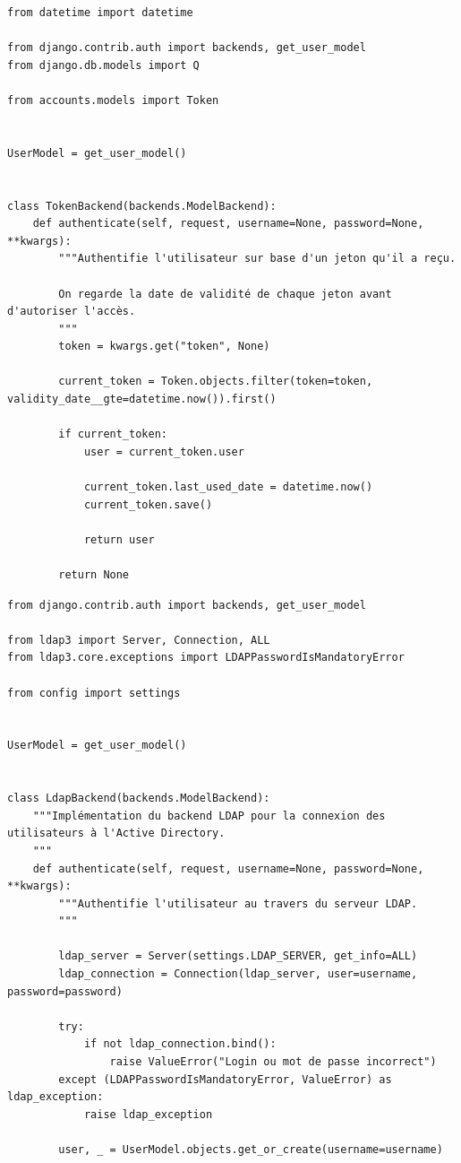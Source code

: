 \documentclass[11pt]{amsbook}
\begin{document}
\begin{verbatim}
from datetime import datetime

from django.contrib.auth import backends, get_user_model
from django.db.models import Q

from accounts.models import Token  


UserModel = get_user_model()


class TokenBackend(backends.ModelBackend):
    def authenticate(self, request, username=None, password=None, **kwargs):
        """Authentifie l'utilisateur sur base d'un jeton qu'il a reçu.

        On regarde la date de validité de chaque jeton avant d'autoriser l'accès.
        """
        token = kwargs.get("token", None)

        current_token = Token.objects.filter(token=token, validity_date__gte=datetime.now()).first()

        if current_token:
            user = current_token.user

            current_token.last_used_date = datetime.now()
            current_token.save()

            return user

        return None
\end{verbatim}


\begin{verbatim}
from django.contrib.auth import backends, get_user_model

from ldap3 import Server, Connection, ALL
from ldap3.core.exceptions import LDAPPasswordIsMandatoryError

from config import settings


UserModel = get_user_model()


class LdapBackend(backends.ModelBackend):
    """Implémentation du backend LDAP pour la connexion des utilisateurs à l'Active Directory.
    """
    def authenticate(self, request, username=None, password=None, **kwargs):
        """Authentifie l'utilisateur au travers du serveur LDAP.
        """

        ldap_server = Server(settings.LDAP_SERVER, get_info=ALL)
        ldap_connection = Connection(ldap_server, user=username, password=password)

        try:
            if not ldap_connection.bind():
                raise ValueError("Login ou mot de passe incorrect")
        except (LDAPPasswordIsMandatoryError, ValueError) as ldap_exception:
            raise ldap_exception

        user, _ = UserModel.objects.get_or_create(username=username)
\end{verbatim}
\end{document}
